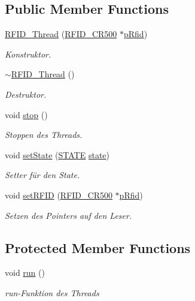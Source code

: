 \subsection*{Public Member Functions}
\begin{CompactItemize}
\item 
\hyperlink{class_r_f_i_d___thread_f60ee945c8912b0628ae1bc481f0ca9b}{RFID\_\-Thread} (\hyperlink{class_r_f_i_d___c_r500}{RFID\_\-CR500} $\ast$\hyperlink{class_r_f_i_d___thread_d25fbcccbbe6d4094736f1bf1b681b7f}{pRfid})
\begin{CompactList}\small\item\em Konstruktor. \item\end{CompactList}\item 
\hyperlink{class_r_f_i_d___thread_805943c4c19f9611d3e5c392d98072ed}{$\sim$RFID\_\-Thread} ()
\begin{CompactList}\small\item\em Destruktor. \item\end{CompactList}\item 
void \hyperlink{class_r_f_i_d___thread_d6fe5c34ad7534b547970cbb1e3cdc78}{stop} ()
\begin{CompactList}\small\item\em Stoppen des Threads. \item\end{CompactList}\item 
void \hyperlink{class_r_f_i_d___thread_d7b71a78a4c22c00d384327101166086}{setState} (\hyperlink{class_r_f_i_d___thread_44a4be086bc76f772174db2b9b389eb1}{STATE} \hyperlink{class_r_f_i_d___thread_9d15987c8d3a0b8e53e936da8e50bdd6}{state})
\begin{CompactList}\small\item\em Setter für den State. \item\end{CompactList}\item 
void \hyperlink{class_r_f_i_d___thread_1c13017995a135d84c7eac183a93fd6e}{setRFID} (\hyperlink{class_r_f_i_d___c_r500}{RFID\_\-CR500} $\ast$\hyperlink{class_r_f_i_d___thread_d25fbcccbbe6d4094736f1bf1b681b7f}{pRfid})
\begin{CompactList}\small\item\em Setzen des Pointers auf den Leser. \item\end{CompactList}\end{CompactItemize}
\subsection*{Protected Member Functions}
\begin{CompactItemize}
\item 
void \hyperlink{class_r_f_i_d___thread_185320343182f6cbbd076d9088bcb3c4}{run} ()
\begin{CompactList}\small\item\em run-Funktion des Threads \item\end{CompactList}\end{CompactItemize}
